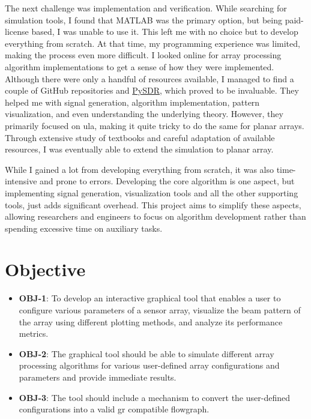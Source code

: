 The next challenge was implementation and verification. While searching for simulation tools, I found that MATLAB was the primary option, but being paid-license based, I was unable to use it. This left me with no choice but to develop everything from scratch. At that time, my programming experience was limited, making the process even more difficult. I looked online for array processing algorithm implementations to get a sense of how they were implemented. Although there were only a handful of resources available, I managed to find a couple of GitHub repositories and \href{https://pysdr.org/}{PySDR}, which proved to be invaluable. They helped me with signal generation, algorithm implementation, pattern visualization, and even understanding the underlying theory. However, they primarily focused on \acf{ula}, making it quite tricky to do the same for planar arrays. Through extensive study of textbooks and careful adaptation of available resources, I was eventually able to extend the simulation to planar array.

While I gained a lot from developing everything from scratch, it was also time-intensive and prone to errors. Developing the core algorithm is one aspect, but implementing signal generation, visualization tools and all the other supporting tools, just adds significant overhead. This project aims to simplify these aspects, allowing researchers and engineers to focus on algorithm development rather than spending excessive time on auxiliary tasks.

\section{Objective} \label{sec: objective}

\begin{itemize}
	\item \textbf{OBJ-1}: To develop an interactive graphical tool that enables a user to configure various parameters of a sensor array,  visualize the beam pattern of the array using different plotting methods, and analyze its performance metrics.
	\item \textbf{OBJ-2}: The graphical tool should be able to simulate different array processing algorithms for various user-defined array configurations and parameters and provide immediate results.
	\item \textbf{OBJ-3}: The tool should include a mechanism to convert the user-defined configurations into a valid \acl{gr} compatible flowgraph.
	
\end{itemize}

